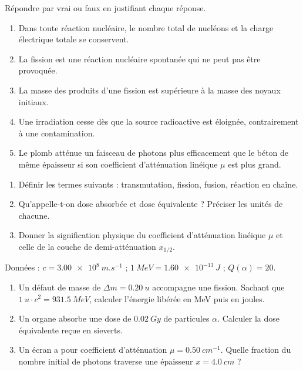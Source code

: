 \documentclass[11pt]{article}
\newcommand{\cle}[1]{{\popxbold\color{popdark}#1}}
\begin{document}
\begin{exercice}
Répondre par vrai ou faux en justifiant chaque réponse.
\begin{enumerate}
\item Dans toute réaction nucléaire, le nombre total de nucléons et la charge électrique totale se conservent.
\item La fission est une réaction nucléaire spontanée qui ne peut pas être provoquée.
\item La masse des produits d'une fission est supérieure à la masse des noyaux initiaux.
\item Une irradiation cesse dès que la source radioactive est éloignée, contrairement à une contamination.
\item Le plomb atténue un faisceau de photons plus efficacement que le béton de même épaisseur si son coefficient d'atténuation linéique $\mu$ est plus grand.
\end{enumerate}
\end{exercice}

\begin{exercice}
\begin{enumerate}
\item Définir les termes suivants : \cle{transmutation}, \cle{fission}, \cle{fusion}, \cle{réaction en chaîne}.
\item Qu'appelle-t-on \cle{dose absorbée} et \cle{dose équivalente} ? Préciser les unités de chacune.
\item Donner la signification physique du coefficient d'atténuation linéique $\mu$ et celle de la couche de demi-atténuation $x_{1/2}$.
\end{enumerate}
\end{exercice}

\begin{exercice}
Données : $c = \SI{3,00e8}{m.s^{-1}}$ ; $\SI{1}{MeV} = \SI{1,60e-13}{J}$ ; $Q(\alpha) = 20$.
\begin{enumerate}
\item Un défaut de masse de $\Delta m = \SI{0,20}{u}$ accompagne une fission. Sachant que $\SI{1}{u} \cdot c^2 = \SI{931,5}{MeV}$, calculer l'énergie libérée en MeV puis en joules.
\item Un organe absorbe une dose de $\SI{0,02}{Gy}$ de particules $\alpha$. Calculer la dose équivalente reçue en sieverts.
\item Un écran a pour coefficient d'atténuation $\mu = \SI{0,50}{cm^{-1}}$. Quelle fraction du nombre initial de photons traverse une épaisseur $x = \SI{4,0}{cm}$ ?
\end{enumerate}
\end{exercice}
\end{document}
